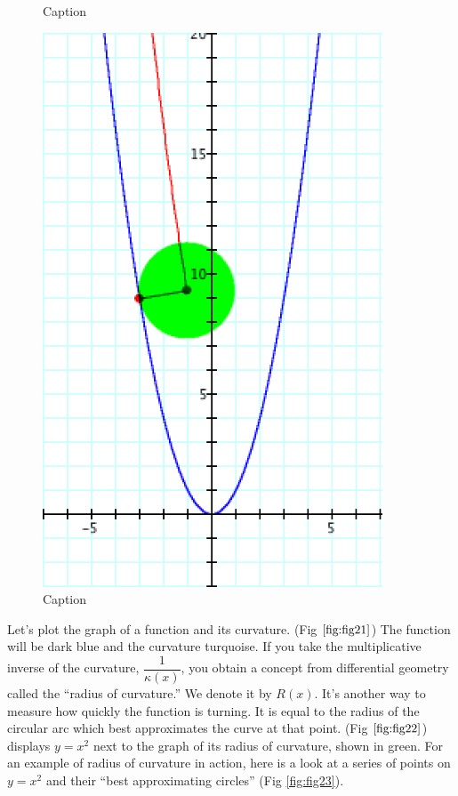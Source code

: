 \begin{figure}[h!]
\begin{minipage}[b]{0.3\linewidth}
    \caption{Caption}
    \label{fig:fig19}
    \vspace{4ex}
  \end{minipage} %
    \begin{minipage}[b]{0.3\linewidth}
    \centering
    \includegraphics[width=0.9\textwidth, height=0.9\textheight, keepaspectratio]{findig-crunch-spots-img/Fig 20.png}
    \caption{Caption}
    \label{fig:fig20}
    \vspace{4ex}
  \end{minipage} %
\end{figure}

Let’s plot the graph of a function and its curvature. (Fig $\ref{fig:fig21}$) The function will be dark blue and the curvature turquoise. If you take the multiplicative inverse of the curvature, $\dfrac{1}{\kappa (x)}$, you obtain a concept from differential geometry called the ``radius of curvature.'' We denote it by $R(x)$. It’s another way to measure how quickly the function is turning. It is equal to the radius of the circular arc which best approximates the curve at that point. (Fig $\ref{fig:fig22}$) displays $y = x^2$ next to the graph of its radius of curvature, shown in green. For an example of radius of curvature in action, here is a look at a series of points on $y = x^2$ and their ``best approximating circles'' (Fig \ref{fig:fig23}).

